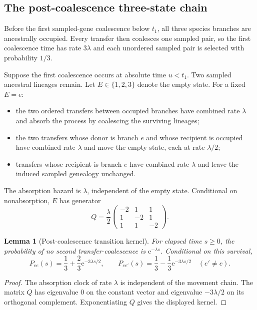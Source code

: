 \documentclass[11pt]{article}
\newtheorem{lemma}[theorem]{Lemma}
\newcommand{\e}{\mathrm e}
\begin{document}
\subsection{The post-coalescence three-state chain}
Before the first sampled-gene coalescence below $t_1$, all three species branches are ancestrally occupied.  Every transfer then coalesces one sampled pair, so the first coalescence time has rate $3\lambda$ and each unordered sampled pair is selected with probability $1/3$.

Suppose the first coalescence occurs at absolute time $u<t_1$.  Two sampled ancestral lineages remain.  Let $E\in\{1,2,3\}$ denote the empty state.  For a fixed $E=e$:
\begin{itemize}
\item the two ordered transfers between occupied branches have combined rate $\lambda$ and absorb the process by coalescing the surviving lineages;
\item the two transfers whose donor is branch $e$ and whose recipient is occupied have combined rate $\lambda$ and move the empty state, each at rate $\lambda/2$;
\item transfers whose recipient is branch $e$ have combined rate $\lambda$ and leave the induced sampled genealogy unchanged.
\end{itemize}
The absorption hazard is $\lambda$, independent of the empty state.  Conditional on nonabsorption, $E$ has generator
\begin{equation}\label{eq:Q}
Q=\frac{\lambda}{2}
\begin{pmatrix}
-2&1&1\\
1&-2&1\\
1&1&-2
\end{pmatrix}.
\end{equation}

\begin{lemma}[Post-coalescence transition kernel]\label{lem:ctmc}
For elapsed time $s\ge0$, the probability of no second transfer-coalescence is $\e^{-\lambda s}$.  Conditional on this survival,
\[
P_{ee}(s)=\frac13+\frac23\e^{-3\lambda s/2},
\qquad
P_{ee'}(s)=\frac13-\frac13\e^{-3\lambda s/2}\quad(e'\ne e).
\]
\end{lemma}
\begin{proof}
The absorption clock of rate $\lambda$ is independent of the movement chain.  The matrix $Q$ has eigenvalue $0$ on the constant vector and eigenvalue $-3\lambda/2$ on its orthogonal complement.  Exponentiating $Q$ gives the displayed kernel.
\end{proof}
\end{document}
